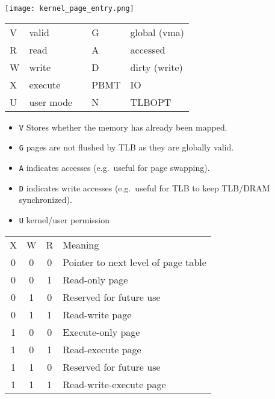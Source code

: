 \newpar{}

\begin{center}
    \texttt{[image: kernel\_page\_entry.png]}
\end{center}

\renewcommand{\arraystretch}{1.3}
\setlength{\oldtabcolsep}{\tabcolsep}\setlength\tabcolsep{6pt}

\begin{tabularx}{\linewidth}{@{}llcll@{}}
    V & valid     &  & G    & global (vma)  \\
    R & read      &  & A    & accessed      \\
    W & write     &  & D    & dirty (write) \\
    X & execute   &  & PBMT & IO            \\
    U & user mode &  & N    & TLBOPT
\end{tabularx}

\newpar{}
\begin{itemize}
    \item \texttt{V} Stores whether the memory has already been mapped.
    \item \texttt{G} pages are not flushed by TLB as they are globally valid.
    \item \texttt{A} indicates accesses (e.g.\ useful for page swapping).
    \item \texttt{D} indicates write accesses (e.g.\ useful for TLB to keep TLB/DRAM synchronized).
    \item \texttt{U} kernel/user permission
\end{itemize}

\newpar{}

\begin{tabularx}{\linewidth}{@{}cccl@{}}
    X & W & R & Meaning                             \\
    \cmidrule{1-4}
    0 & 0 & 0 & Pointer to next level of page table \\
    0 & 0 & 1 & Read-only page                      \\
    0 & 1 & 0 & Reserved for future use             \\
    0 & 1 & 1 & Read-write page                     \\
    1 & 0 & 0 & Execute-only page                   \\
    1 & 0 & 1 & Read-execute page                   \\
    1 & 1 & 0 & Reserved for future use             \\
    1 & 1 & 1 & Read-write-execute page
\end{tabularx}

